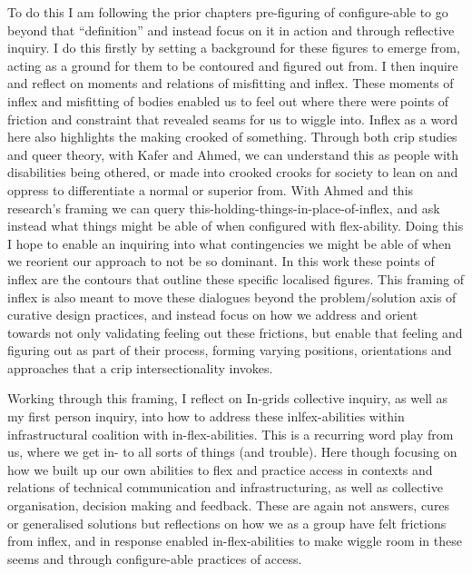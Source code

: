To do this I am following the prior chapters pre-figuring of
configure-able to go beyond that ``definition'' and instead focus on it
in action and through reflective inquiry. I do this firstly by setting a
background for these figures to emerge from, acting as a ground for them
to be contoured and figured out from. I then inquire and reflect on
moments and relations of misfitting and inflex. These moments of inflex
and misfitting of bodies enabled us to feel out where there were points
of friction and constraint that revealed seams for us to wiggle into.
Inflex as a word here also highlights the making crooked of something.
Through both crip studies and queer theory, with Kafer and Ahmed, we can
understand this as people with disabilities being othered, or made into
crooked crooks for society to lean on and oppress to differentiate a
normal or superior from. With Ahmed and this research's framing we can
query this-holding-things-in-place-of-inflex, and ask instead what
things might be able of when configured with flex-ability. Doing this I
hope to enable an inquiring into what contingencies we might be able of
when we reorient our approach to not be so dominant. In this work these
points of inflex are the contours that outline these specific localised
figures. This framing of inflex is also meant to move these dialogues
beyond the problem/solution axis of curative design practices, and
instead focus on how we address and orient towards not only validating
feeling out these frictions, but enable that feeling and figuring out as
part of their process, forming varying positions, orientations and
approaches that a crip intersectionality invokes.

Working through this framing, I reflect on In-grids collective inquiry,
as well as my first person inquiry, into how to address these
inlfex-abilities within infrastructural coalition with
in-flex-abilities. This is a recurring word play from us, where we get
in- to all sorts of things (and trouble). Here though focusing on how we
built up our own abilities to flex and practice access in contexts and
relations of technical communication and infrastructuring, as well as
collective organisation, decision making and feedback. These are again
not answers, cures or generalised solutions but reflections on how we as
a group have felt frictions from inflex, and in response enabled
in-flex-abilities to make wiggle room in these seems and through
configure-able practices of access.
